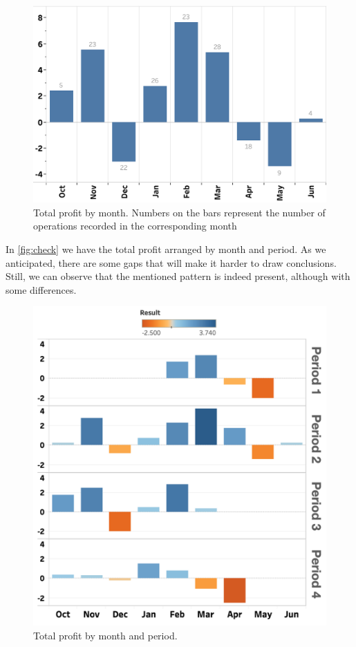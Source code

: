 \documentclass[sigconf, nonacm]{acmart}
\begin{document}
\begin{figure}[hb]
  \centering
  \includegraphics[width=\linewidth]{figures/pic3}
  \caption{Total profit by month. Numbers on the bars represent the number of operations recorded in the corresponding month}
  \label{fig:clock}
\end{figure}

In \autoref{fig:check} we have the total profit arranged by month and period. As we anticipated, there are some gaps that will make it harder to draw conclusions. Still, we can observe that the mentioned pattern is indeed present, although with some differences.

\begin{figure}[hb]
  \centering
  \includegraphics[width=\linewidth]{figures/pic4}
  \caption{Total profit by month and period.}
  \label{fig:check}
\end{figure}
\end{document}
